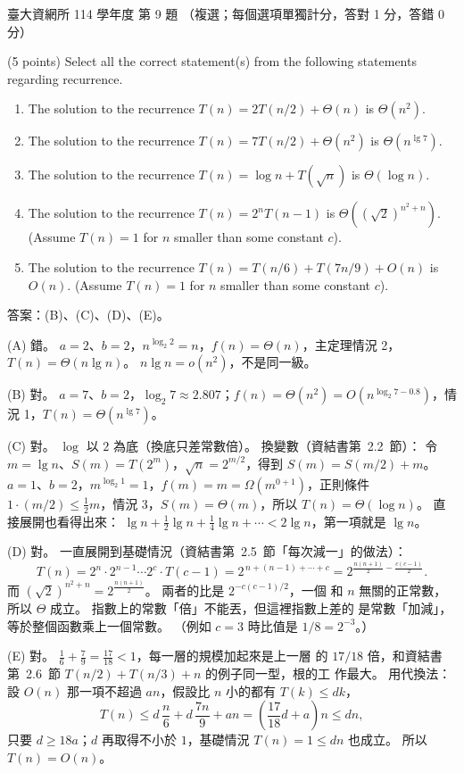 \begin{pastexam}[label={px:ntu-114-dsa-09}]{臺大資網所 114 學年度 第 9 題}
（複選；每個選項單獨計分，答對 1 分，答錯 0 分）

(5 points) Select all the correct statement(s) from the following statements regarding recurrence.
\begin{enumerate}[label=(\Alph*)]
\item The solution to the recurrence $T(n)=2T(n/2)+\Theta(n)$ is $\Theta(n^2)$.
\item The solution to the recurrence $T(n)=7T(n/2)+\Theta(n^2)$ is $\Theta(n^{\lg 7})$.
\item The solution to the recurrence $T(n)=\log n+T(\sqrt{n})$ is $\Theta(\log n)$.
\item The solution to the recurrence $T(n)=2^nT(n-1)$ is $\Theta((\sqrt{2})^{n^2+n})$. (Assume $T(n)=1$ for $n$
smaller than some constant $c$).
\item The solution to the recurrence $T(n)=T(n/6)+T(7n/9)+O(n)$ is $O(n)$. (Assume $T(n)=1$ for $n$ smaller than
some constant $c$).
\end{enumerate}
\end{pastexam}

\begin{pastsoln}
答案：(B)、(C)、(D)、(E)。

(A) 錯。 $a = 2$、$b = 2$，$n^{\log_2 2} = n$，$f(n) = \Theta(n)$，主定理情況 2，
$T(n) = \Theta(n \lg n)$。 $n \lg n = o(n^2)$，不是同一級。

(B) 對。 $a = 7$、$b = 2$，$\log_2 7 \approx 2.807$；$f(n) = \Theta(n^2) =
O(n^{\log_2 7 - 0.8})$，情況 1，$T(n) = \Theta(n^{\lg 7})$。

(C) 對。 $\log$ 以 $2$ 為底（換底只差常數倍）。 換變數（資結書第~2.2~節）：
令 $m = \lg n$、$S(m) = T(2^m)$，$\sqrt{n} = 2^{m/2}$，得到 $S(m) = S(m/2) + m$。
$a = 1$、$b = 2$，$m^{\log_2 1} = 1$，$f(m) = m = \Omega(m^{0 + 1})$，正則條件
$1 \cdot (m/2) \le \frac{1}{2} m$，情況 3，$S(m) = \Theta(m)$，所以
$T(n) = \Theta(\log n)$。 直接展開也看得出來：
$\lg n + \frac{1}{2}\lg n + \frac{1}{4}\lg n + \cdots < 2\lg n$，第一項就是
$\lg n$。

(D) 對。 一直展開到基礎情況（資結書第~2.5~節「每次減一」的做法）：
\[
T(n) = 2^n \cdot 2^{n-1} \cdots 2^{c} \cdot T(c - 1) = 2^{\,n + (n-1) + \cdots + c}
= 2^{\frac{n(n+1)}{2} - \frac{c(c-1)}{2}} .
\]
而 $(\sqrt{2})^{n^2 + n} = 2^{\frac{n(n+1)}{2}}$。 兩者的比是 $2^{-c(c-1)/2}$，一個
和 $n$ 無關的正常數，所以 $\Theta$ 成立。 指數上的常數「倍」不能丟，但這裡指數上差的
是常數「加減」，等於整個函數乘上一個常數。 （例如 $c = 3$ 時比值是 $1/8 = 2^{-3}$。）

(E) 對。 $\frac{1}{6} + \frac{7}{9} = \frac{17}{18} < 1$，每一層的規模加起來是上一層
的 $17/18$ 倍，和資結書第~2.6~節 $T(n/2) + T(n/3) + n$ 的例子同一型，根的工
作最大。 用代換法：設 $O(n)$ 那一項不超過 $an$，假設比 $n$ 小的都有 $T(k) \le dk$，
\[
T(n) \le d\,\frac{n}{6} + d\,\frac{7n}{9} + an = \left(\frac{17}{18}d + a\right) n
\le dn ,
\]
只要 $d \ge 18a$；$d$ 再取得不小於 $1$，基礎情況 $T(n) = 1 \le dn$ 也成立。 所以
$T(n) = O(n)$。
\end{pastsoln}
